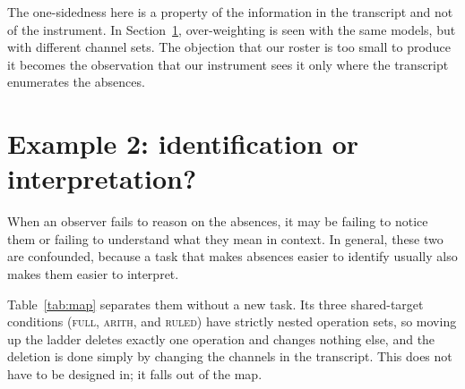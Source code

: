 \documentclass{article}
\theoremstyle{plain}
\theoremstyle{definition}
\theoremstyle{remark}
\newcommand{\cond}[1]{\textsc{#1}}   %
\begin{document}
  \ParaTallies
\else
  \ParaTallies

  \ParaAnchor
\fi

The one-sidedness here is a property of the information in the transcript
and not of the instrument. In Section~\ref{sec:ex2}, over-weighting is seen
with the same models, but with different channel sets. The objection that our 
roster is too small to produce it becomes the observation
that our instrument sees it only where the transcript enumerates the absences.


\section{Example 2: identification or interpretation?}\label{sec:ex2}

When an observer fails to reason on the absences, it may be failing to notice them or
failing to understand what they mean in context. In general,
 these two are confounded,
because a task that makes absences easier to identify usually also makes them
easier to interpret.

Table~\ref{tab:map} separates them without a new task. Its three shared-target
conditions (\cond{full}, \cond{arith}, and \cond{ruled}) have
strictly nested operation sets, so moving up the ladder deletes
exactly one operation and changes nothing else, and the deletion is done simply
by changing the channels in the transcript. This does not have to be designed
in; it falls out of the map.
\end{document}
